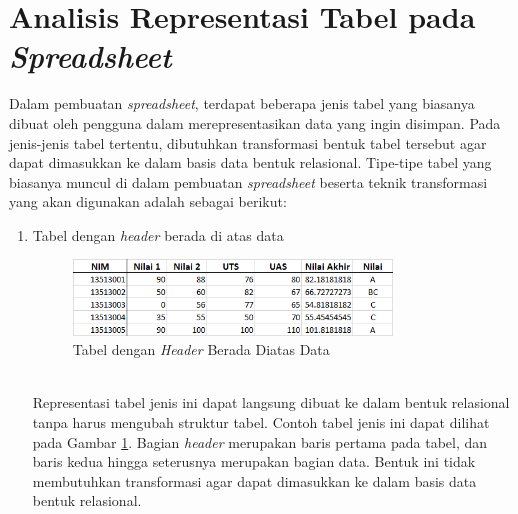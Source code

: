 \section{Analisis Representasi Tabel pada \textit{Spreadsheet}}
Dalam pembuatan \textit{spreadsheet}, terdapat beberapa jenis tabel yang biasanya dibuat oleh pengguna dalam merepresentasikan data yang ingin disimpan. Pada jenis-jenis tabel tertentu, dibutuhkan transformasi bentuk tabel tersebut agar dapat dimasukkan ke dalam basis data bentuk relasional. Tipe-tipe tabel yang biasanya muncul di dalam pembuatan \textit{spreadsheet} beserta teknik transformasi yang akan digunakan adalah sebagai berikut:
\begin{enumerate}
	\item Tabel dengan \textit{header} berada di atas data
	\begin{figure}[htbp]
	    \centering
	    \includegraphics[width=0.8\textwidth]{resources/chapter-3-tabletype-1.png}
	    \caption{Tabel dengan \textit{Header} Berada Diatas Data}
		\label{TabelTipe1}
	\end{figure}\\
	Representasi tabel jenis ini dapat langsung dibuat ke dalam bentuk relasional tanpa harus mengubah struktur tabel. Contoh tabel jenis ini dapat dilihat pada Gambar \ref{TabelTipe1}. Bagian \textit{header} merupakan baris pertama pada tabel, dan baris kedua hingga seterusnya merupakan bagian data. Bentuk ini tidak membutuhkan transformasi agar dapat dimasukkan ke dalam basis data bentuk relasional.


\end{enumerate}
